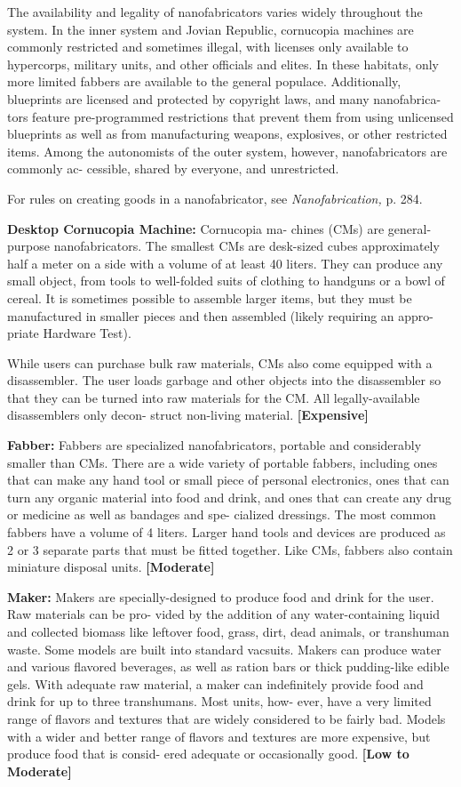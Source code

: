 The availability and legality of nanofabricators 
varies widely throughout the system. In the inner 
system and Jovian Republic, cornucopia machines 
are commonly restricted and sometimes illegal, with 
licenses only available to hypercorps, military units, 
and other officials and elites. In these habitats, only 
more limited fabbers are available to the general 
populace. Additionally, blueprints are licensed and 
protected by copyright laws, and many nanofabrica-
tors feature pre-programmed restrictions that prevent 
them from using unlicensed blueprints as well as 
from manufacturing weapons, explosives, or other 
restricted items. Among the autonomists of the outer 
system, however, nanofabricators are commonly ac-
cessible, shared by everyone, and unrestricted.

For rules on creating goods in a nanofabricator, see 
\textit{Nanofabrication,} p. 284.

\textbf{Desktop Cornucopia Machine:} Cornucopia ma-
chines (CMs) are general-purpose nanofabricators. 
The smallest CMs are desk-sized cubes approximately 
half a meter on a side with a volume of at least 40 
liters. They can produce any small object, from tools 
to well-folded suits of clothing to handguns or a bowl 
of cereal. It is sometimes possible to assemble larger 
items, but they must be manufactured in smaller 
pieces and then assembled (likely requiring an appro-
priate Hardware Test).

While users can purchase bulk raw materials, CMs 
also come equipped with a disassembler. The user 
loads garbage and other objects into the disassembler 
so that they can be turned into raw materials for the 
CM. All legally-available disassemblers only decon-
struct non-living material. \textbf{[Expensive]}

\textbf{Fabber:} Fabbers are specialized nanofabricators, 
portable and considerably smaller than CMs. There 
are a wide variety of portable fabbers, including 
ones that can make any hand tool or small piece of 
personal electronics, ones that can turn any organic 
material into food and drink, and ones that can create 
any drug or medicine as well as bandages and spe-
cialized dressings. The most common fabbers have a 
volume of 4 liters. Larger hand tools and devices are 
produced as 2 or 3 separate parts that must be fitted 
together. Like CMs, fabbers also contain miniature 
disposal units. \textbf{[Moderate]}

\textbf{Maker:} Makers are specially-designed to produce 
food and drink for the user. Raw materials can be pro-
vided by the addition of any water-containing liquid 
and collected biomass like leftover food, grass, dirt, 
dead animals, or transhuman waste. Some models are 
built into standard vacsuits. Makers can produce water 
and various flavored beverages, as well as ration bars 
or thick pudding-like edible gels. With adequate raw 
material, a maker can indefinitely provide food and 
drink for up to three transhumans. Most units, how-
ever, have a very limited range of flavors and textures 
that are widely considered to be fairly bad. Models 
with a wider and better range of flavors and textures 
are more expensive, but produce food that is consid-
ered adequate or occasionally good. \textbf{[Low to Moderate]}

